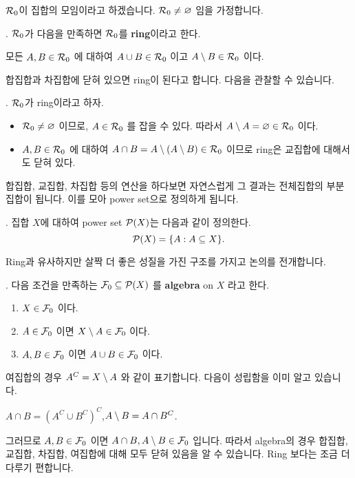 \(\mathcal{R}_0\)이 집합의 모임이라고 하겠습니다. \(\mathcal{R}_0 \neq \varnothing\) 임을 가정합니다.

.  \(\mathcal{R}_0\)가 다음을 만족하면 \(\mathcal{R}_0\)를 \textbf{ring}이라고 한다.
\begin{center}
    모든 \(A, B \in \mathcal{R}_0\) 에 대하여 \(A \cup B \in \mathcal{R}_0\) 이고 \(A \setminus B \in \mathcal{R}_0\) 이다.
\end{center}

합집합과 차집합에 닫혀 있으면 ring이 된다고 합니다. 다음을 관찰할 수 있습니다.

\prop. \(\mathcal{R}_0\)가 ring이라고 하자.
\begin{itemize}
    \item \(\mathcal{R}_0\neq \varnothing\) 이므로, \(A \in \mathcal{R}_0\) 를 잡을 수 있다. 따라서 \(A \setminus A = \varnothing \in \mathcal{R}_0\) 이다.
    \item \(A, B \in \mathcal{R}_0\) 에 대하여 \(A \cap B = A \setminus (A \setminus B) \in \mathcal{R}_0\) 이므로 ring은 교집합에 대해서도 닫혀 있다.
\end{itemize}

합집합, 교집합, 차집합 등의 연산을 하다보면 자연스럽게 그 결과는 전체집합의 부분집합이 됩니다. 이를 모아 power set으로 정의하게 됩니다.

.  집합 \(X\)에 대하여 power set \(\mathcal{P}(X)\)는 다음과 같이 정의한다.
\[
    \mathcal{P}(X) = \{A : A \subseteq X\}.
\]

Ring과 유사하지만 살짝 더 좋은 성질을 가진 구조를 가지고 논의를 전개합니다.

.  다음 조건을 만족하는 \(\mathcal{F}_0 \subseteq \mathcal{P}(X)\) 를 \textbf{algebra} on \(X\) 라고 한다.
\begin{enumerate}
    \item \(X \in \mathcal{F}_0\) 이다.
    \item \(A \in \mathcal{F}_0\) 이면 \(X \setminus A \in \mathcal{F}_0\) 이다.
    \item \(A, B \in \mathcal{F}_0\) 이면 \(A\cup B \in \mathcal{F}_0\) 이다.
\end{enumerate}

\rmk 여집합의 경우 \(A^C = X \setminus A\) 와 같이 표기합니다. 다음이 성립함을 이미 알고 있습니다.
\begin{center}
    \(A \cap B = (A^C \cup B^C)^C\),\quad \(A\setminus B = A \cap B^C\).
\end{center}

그러므로 \(A, B \in \mathcal{F}_0\) 이면 \(A \cap B, A \setminus B \in \mathcal{F}_0\) 입니다. 따라서 algebra의 경우 합집합, 교집합, 차집합, 여집합에 대해 모두 닫혀 있음을 알 수 있습니다. Ring 보다는 조금 더 다루기 편합니다.

